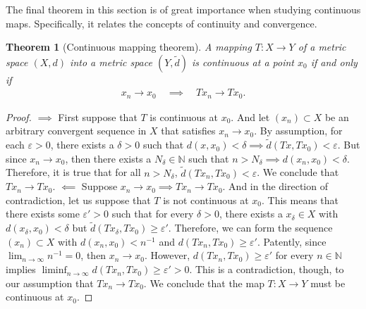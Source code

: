 \documentclass[11pt]{article}
\theoremstyle{mystyle}
\newtheorem{thm}{Theorem}[section]
\newcommand{\0}{\mathbf{0}}
\begin{document}
The final theorem in this section is of great importance when studying continuous maps. Specifically, it relates the concepts of continuity and convergence.
\begin{thm}[Continuous mapping theorem]\label{continuousmapping}
A mapping $T: X \longrightarrow Y$ of a metric space $(X, d)$ into a metric space $(Y, \tilde{d})$ is continuous at a point $x_0$ if and only if
\begin{align*}
    x_n \longrightarrow x_0 \quad \implies \quad Tx_n \longrightarrow Tx_0.
\end{align*}
\end{thm}
\begin{proof}
$\implies$ First suppose that $T$ is continuous at $x_0$. And let $(x_n) \subset X$ be an arbitrary convergent sequence in $X$ that satisfies $x_n \longrightarrow x_0$. By assumption, for each $\varepsilon > 0$, there exists a $\delta > 0$ such that $d(x, x_0) < \delta \implies \tilde{d}(Tx, Tx_0) < \varepsilon$. But since $x_n \longrightarrow x_0$, then there exists a $N_{\delta} \in \mathbb{N}$ such that $n > N_{\delta} \implies d(x_n, x_0) < \delta$. Therefore, it is true that for all $n > N_{\delta}$, $\tilde{d}(Tx_n, Tx_0) < \varepsilon$. We conclude that $Tx_n \longrightarrow Tx_0$.\newline
$\impliedby$ Suppose $x_n \longrightarrow x_0 \implies Tx_n \longrightarrow Tx_0$. And in the direction of contradiction, let us suppose that $T$ is not continuous at $x_0$. This means that there exists some $\varepsilon' > 0$ such that for every $\delta > 0$, there exists a $x_{\delta} \in X$ with $d(x_{\delta}, x_0) < \delta$ but $\tilde{d}(Tx_{\delta},Tx_0) \geq \varepsilon'$. Therefore, we can form the sequence $(x_n) \subset X$ with $d(x_n, x_0) < n^{-1}$ and $d(Tx_n, Tx_0) \geq \varepsilon'$. Patently, since $\lim_{n \to \infty} n^{-1} = 0$, then $x_n \longrightarrow x_0$. However, $d(Tx_n, Tx_0) \geq \varepsilon'$ for every $n \in \mathbb{N}$ implies $\liminf_{n \to \infty} d(Tx_n, Tx_0) \geq \varepsilon' > 0$. This is a contradiction, though, to our assumption that $Tx_n \longrightarrow Tx_0$. We conclude that the map $T: X \longrightarrow Y$ must be continuous at $x_0$.
\end{proof}
\end{document}

